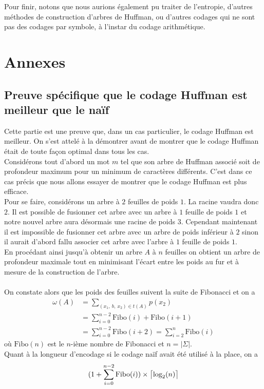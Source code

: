 \documentclass[a4paper, 12pt]{article}
\DeclarePairedDelimiter{\ceil}{\lceil}{\rceil}
\begin{document}
Pour finir, notons que nous aurions également pu traiter de l'entropie, d'autres méthodes de construction d'arbres de Huffman, ou d'autres codages qui ne sont pas des codages par symbole, à l'instar du codage arithmétique.

\newpage

\section{Annexes}
\subsection{Preuve spécifique que le codage Huffman est meilleur que le naïf}
Cette partie est une preuve que, dans un cas particulier, le codage Huffman est meilleur. On s'est attelé à la démontrer avant de montrer que le codage Huffman était de toute façon optimal dans tous les cas. \\

Considérons tout d'abord un mot $m$ tel que son arbre de Huffman associé soit de profondeur maximum pour un minimum de caractères différents. C'est dans ce cas précis que nous allons essayer de montrer que le codage Huffman est plus efficace. \\
Pour se faire, considérons un arbre à $2$ feuilles de poids $1$. La racine vaudra donc $2$. Il est possible de fusionner cet arbre avec un arbre à $1$ feuille de poids $1$ et notre nouvel arbre aura désormais une racine de poids $3$. Cependant maintenant il est impossible de fusionner cet arbre avec un arbre de poids inférieur à $2$ sinon il aurait d'abord fallu associer cet arbre avec l'arbre à $1$ feuille de poids $1$. \\
En procédant ainsi jusqu'à obtenir un arbre $A$ à $n$ feuilles on obtient un arbre de profondeur maximale tout en minimisant l'écart entre les poids au fur et à mesure de la construction de l'arbre. \\ \\
On constate alors que les poids des feuilles suivent la suite de Fibonacci et on a
\begin{align*}
\omega(A) &= \sum_{(x_1,\ b,\ x_2)\in t(A)} p(x_2)‎‎ \\
&= \sum_{i = 0}^{n-2} \text{Fibo}(i)+\text{Fibo}(i+1) \\
&= \sum_{i = 0}^{n-2} \text{Fibo}(i+2) = \sum_{i = 2}^n \text{Fibo}(i)
\end{align*}
où $\text{Fibo}(n)$ est le $n$-ième nombre de Fibonacci et $n = |\Sigma|$. \\
Quant à la longueur d'encodage si le codage naïf avait été utilisé à la place, on a
$$
(1+\sum_{i = 0}^{n-2}\text{Fibo}(i))\times \ceil[\big]{\text{log}_2(n)}
$$
\end{document}
